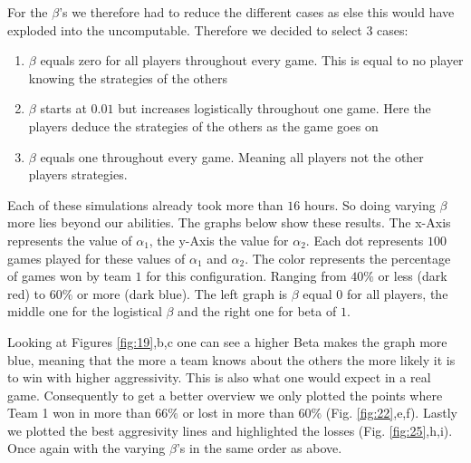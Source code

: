 For the $\beta$'s we therefore had to reduce the different cases as else this would have exploded into the uncomputable. Therefore we decided to select 3 cases:
\begin{enumerate}
\item $\beta$ equals zero for all players throughout every game. This is equal to no player knowing the strategies of the others
\item $\beta$ starts at $0.01$ but increases logistically throughout one game. Here the players deduce the strategies of the others as the game goes on
\item $\beta$ equals one throughout every game. Meaning all players not the other players strategies.
\end{enumerate}

Each of these simulations already took more than $16$ hours. So doing varying $\beta$ more lies beyond our abilities. 
The graphs below show these results. The x-Axis represents the value of $\alpha_1$, the y-Axis the value for $\alpha_2$. Each dot represents $100$ games played for these values of $\alpha_1$ and $\alpha_2$. The color represents the percentage of games won by team $1$ for this configuration. Ranging from $40\%$ or less (dark red) to $60\%$ or more (dark blue). The left graph is $\beta$ equal $0$ for all players, the middle one for the logistical $\beta$ and the right one for beta of $1$.

Looking at Figures \ref{fig:19},b,c one can see a higher Beta makes the graph more blue, meaning that the more a team knows about the others the more likely it is to win with higher aggressivity. This is also what one would expect in a real game.
Consequently to get a better overview we only plotted the points where Team 1 won in more than $66\%$ or lost in more than $60\%$ (Fig. \ref{fig:22},e,f).
Lastly we plotted the best aggresivity lines and highlighted the losses (Fig. \ref{fig:25},h,i). Once again with the varying $\beta$'s in the same order as above.

